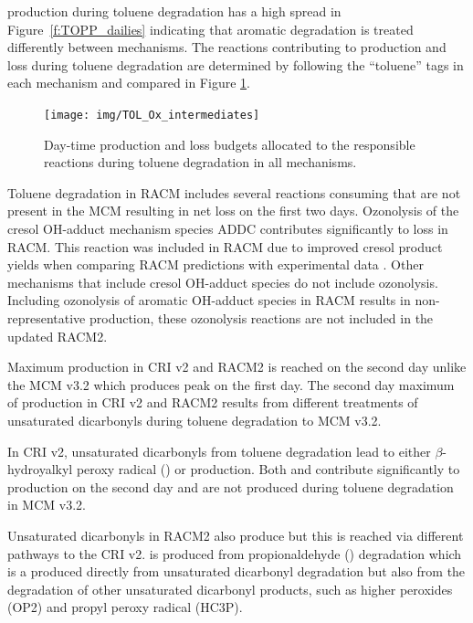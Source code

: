  production during toluene degradation has a high spread in \mbox{Figure \ref{f:TOPP_dailies}} indicating that aromatic degradation is treated differently between mechanisms.
The reactions contributing to  production and loss during toluene degradation are determined by following the ``toluene'' tags in each mechanism and compared in Figure \ref{f:toluene_Ox}.

\begin{figure}
    \centering
    \texttt{[image: img/TOL\_Ox\_intermediates]}
    \vspace{0mm}
    \caption{Day-time  production and loss budgets allocated to the responsible reactions during toluene degradation in all mechanisms.}
    \vspace{-4mm}
    \label{f:toluene_Ox}
\end{figure}

Toluene degradation in RACM includes several reactions consuming  that are not present in the MCM resulting in net  loss on the first two days.
Ozonolysis of the cresol OH-adduct mechanism species ADDC contributes significantly to  loss in RACM.
This reaction was included in RACM due to improved cresol product yields when comparing RACM predictions with experimental data \citep{Stockwell:1997}. 
Other mechanisms that include cresol OH-adduct species do not include ozonolysis.
Including ozonolysis of aromatic OH-adduct species in RACM results in non-representative  production, these ozonolysis reactions are not included in the updated RACM2.

Maximum  production in CRI v2 and RACM2 is reached on the second day unlike the MCM v3.2 which produces peak  on the first day.
The second day maximum of  production in CRI v2 and RACM2 results from different treatments of unsaturated dicarbonyls during toluene degradation to MCM v3.2.

In CRI v2, unsaturated dicarbonyls from toluene degradation lead to either $\beta$-hydroyalkyl peroxy radical () or  production.
Both  and  contribute significantly to  production on the second day and are not produced during toluene degradation in MCM v3.2.

Unsaturated dicarbonyls in RACM2 also produce  but this is reached via different pathways to the CRI v2.
 is produced from propionaldehyde () degradation which is a produced directly from unsaturated dicarbonyl degradation but also from the degradation of other unsaturated dicarbonyl products, such as higher peroxides (OP2) and propyl peroxy radical (HC3P).

